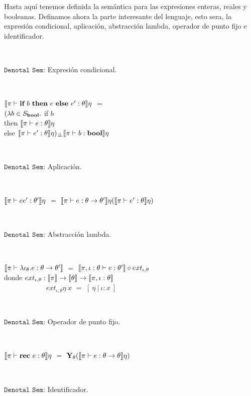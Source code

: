 Hasta aqu\'i tenemos definida la sem\'antica para las expresiones enteras,
reales y booleanas. Definamos ahora la parte interesante del lenguaje, esto 
sera, la expresi\'on condicional, aplicaci\'on, abstracci\'on lambda, operador
de punto fijo e identificador.

\

\noindent
$\texttt{Denotal Sem:}$ Expresi\'on condicional.\

\

$\llbracket \pi \vdash \textbf{if} \ b \ \textbf{then} \ e \ \textbf{else} \ e' : \theta \rrbracket\eta$ $=$\\
		\indent \indent \indent $(\lambda b \in S_{\textbf{bool}} .$ if $b$ \\
		\indent \indent \indent \indent \indent \indent \indent 
											then $\llbracket \pi \vdash e : \theta \rrbracket\eta$\\
		\indent \indent \indent \indent \indent \indent \indent 
											else $\llbracket \pi \vdash e' : \theta \rrbracket\eta)_{\bot \!\!\! \bot}\llbracket \pi \vdash b : \textbf{bool} \rrbracket\eta$

\

\noindent
$\texttt{Denotal Sem:}$ Aplicaci\'on.\

\

$\llbracket \pi \vdash ee' : \theta' \rrbracket\eta$ $=$ $\llbracket \pi \vdash e : \theta \rightarrow \theta' \rrbracket\eta
														  (\llbracket \pi \vdash e' : \theta \rrbracket\eta)$

\

\noindent
$\texttt{Denotal Sem:}$ Abstracci\'on lambda.\

\

$\llbracket \pi \vdash \lambda \iota_{\theta} . e : \theta \rightarrow \theta' \rrbracket$ $=$
		$\llbracket \pi,\iota:\theta \vdash e : \theta' \rrbracket \circ ext_{\iota,\theta}$\\

donde 
$ext_{\iota,\theta} : \llbracket \pi \rrbracket 
					  \rightarrow \llbracket \theta \rrbracket \rightarrow \llbracket \pi,\iota:\theta \rrbracket$\\
\indent \ \ \ \ \ \ \ \ \ \ \ \
$ext_{\iota,\theta} \eta \ x$ $=$ $[\ \eta \ | \ \iota:x \ ]$

\

\noindent
$\texttt{Denotal Sem:}$ Operador de punto fijo.\

\

$\llbracket \pi \vdash \textbf{rec} \ e : \theta \rrbracket\eta$ $=$ $\textbf{Y}_{\theta} (\llbracket \pi \vdash e : \theta \rightarrow \theta \rrbracket\eta)$

\

\noindent
$\texttt{Denotal Sem:}$ Identificador.\

